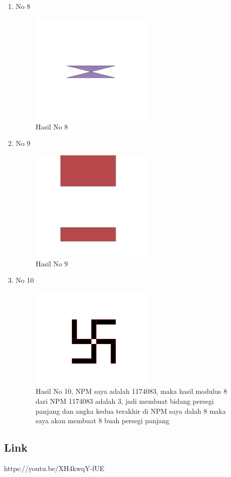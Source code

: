 \begin{enumerate}
	\item No 8
	
	\begin{figure}[H]
		\includegraphics[width=6cm]{figures/Tugas2/1174083/8.png}
		\centering
		\caption{Hasil No 8}
	\end{figure}

	\item No 9
	
	\begin{figure}[H]
		\includegraphics[width=6cm]{figures/Tugas2/1174083/9.png}
		\centering
		\caption{Hasil No 9}
	\end{figure}

	\item No 10
	
	\begin{figure}[H]
		\includegraphics[width=6cm]{figures/Tugas2/1174083/10.png}
		\centering
		\caption{Hasil No 10, NPM saya adalah 1174083, maka hasil modulus 8 dari NPM 1174083 adalah 3, jadi membuat bidang persegi panjang dan angka kedua terakhir di NPM saya dalah 8 maka saya akan membuat 8 buah persegi panjang}
	\end{figure}	
	
\end{enumerate}
\subsection{Link}
	https://youtu.be/XH4kwqY-fUE